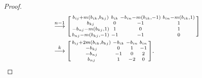 \documentclass[10pt]{article}
\theoremstyle{definition}
\theoremstyle{remark}
\numberwithin{equation}{section}
\newcommand{\0}{{\mathbf{0}}}
\begin{document}
\begin{proof}
\begin{align*}
&\overset{n-1}{\longrightarrow}
\begin{bsmallmatrix*}
b_{ij}+m(b_{ik},b_{kj}) & b_{ik} & -b_{in}-m(b_{ik},-1) & b_{in}-m(b_{ik},1)\\
b_{kj}& 0 & -1 & 1\\
-b_{nj}-m(b_{kj},1)& 1 & 0 & 1\\
b_{nj}-m(b_{kj},-1) & -1 & -1 & 0
\end{bsmallmatrix*}\\
&\overset{k}{\longrightarrow}
\begin{bsmallmatrix*}
b_{ij}+2m(b_{ik},b_{kj}) & -b_{ik} & -b_{in} & b_{in}\\
-b_{kj} & 0 & 1 & -1\\
-b_{nj} & -1 & 0 & 2\\
b_{nj} & 1 & -2 & 0
\end{bsmallmatrix*}.
\end{align*}


\end{proof}
\end{document}
